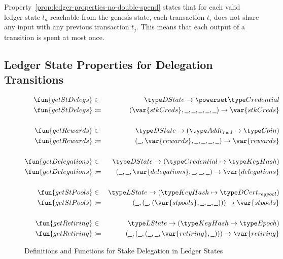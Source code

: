 Property~\ref{prop:ledger-properties-no-double-spend} states that for each valid
ledger state $l_{n}$ reachable from the genesis state, each transaction $t_{i}$
does not share any input with any previous transaction $t_{j}$. This means that
each output of a transition is spent at most once.

\subsection{Ledger State Properties for Delegation Transitions}
\label{sec:ledg-prop-deleg}

\begin{figure}[ht]
  \centering
  \begin{align*}
    \fun{getStDelegs} & \in & \DState \to \powerset \Credential \\
    \fun{getStDelegs} & \coloneqq &
                                    (\var{stkCreds}, \wcard,
                                    \wcard,\wcard,\wcard,\wcard) \to \var{stkCreds} \\
                      &&\\
    \fun{getRewards} & \in & \DState \to (\AddrRWD \mapsto \Coin) \\
    \fun{getRewards} & \coloneqq & (\wcard, \var{rewards},
                                   \wcard,\wcard,\wcard,\wcard)
                                   \to \var{rewards} \\
                      &&\\
    \fun{getDelegations} & \in & \DState \to (\Credential \mapsto \KeyHash) \\
    \fun{getDelegations} & \coloneqq & (\wcard, \wcard,
                                       \var{delegations},\wcard,\wcard,\wcard) \to
                                       \var{delegations} \\
                      &&\\
    \fun{getStPools} & \in & \LState \to (\KeyHash \mapsto \DCertRegPool) \\
    \fun{getStPools} & \coloneqq & (\wcard, (\wcard,
                                   (\var{stpools},\wcard,\wcard,\wcard))) \to \var{stpools} \\
                      &&\\
    \fun{getRetiring} & \in & \LState \to (\KeyHash \mapsto \Epoch) \\
    \fun{getRetiring} & \coloneqq & (\wcard, (\wcard,
                                    (\wcard, \wcard, \var{retiring},\wcard))) \to \var{retiring} \\
  \end{align*}
  \caption{Definitions and Functions for Stake Delegation in Ledger States}
  \label{fig:stake-delegation-functions}
\end{figure}


